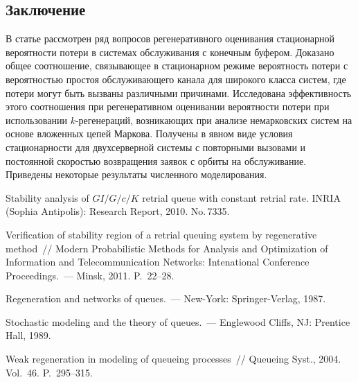 \begin{multicols}{2}


\addtocounter{table}{1}


\section{Заключение} 

В статье рассмотрен ряд   вопросов
 регенеративного оценивания  стационарной вероятности потери в системах
обслуживания с  конечным буфером. Доказано
 общее соотношение,  связывающее в стационарном режиме вероятность потери с
ве\-ро\-ят\-ностью простоя обслуживающего канала  для широкого класса систем, где
потери могут быть вызваны  различными причинами.  Исследована эффективность этого
соотношения при регенеративном оценивании вероятности потери при использовании
$k$-регенераций, возникающих при анализе немарковских систем на основе
вложенных цепей Маркова. Получены в явном виде условия стационарности для
двухсерверной системы с повторными вызовами и постоянной скоростью возвращения
заявок с орбиты на обслуживание. Приведены некоторые  результаты численного
моделирования.

{\small\frenchspacing
{%
\begin{thebibliography}{99}

  Stability  analysis of $GI/G/c/K$ retrial queue
with constant retrial rate. \mbox{INRIA} (Sophia Antipolis): Research
Report,  2010. No.\,7335.

Verification of stability region of a retrial queuing system by
    regenerative method~// Modern Probabilistic Methods for Analysis 
    and Optimization of Information and Telecommunication Networks: 
    Intenational Conference Proceedings.~--- Minsk, 2011. P.~22--28.

   
 Regeneration and networks of queues.~--- New-York: Springer-Verlag,  1987.

 Stochastic modeling and the theory of
    queues.~--- Englewood Cliffs, NJ: Prentice Hall, 1989.
    
 Weak regeneration in modeling of
    queueing processes~// Queueing Syst., 2004. Vol.~46.   P.~295--315.


\end{thebibliography}}}
\end{multicols}
